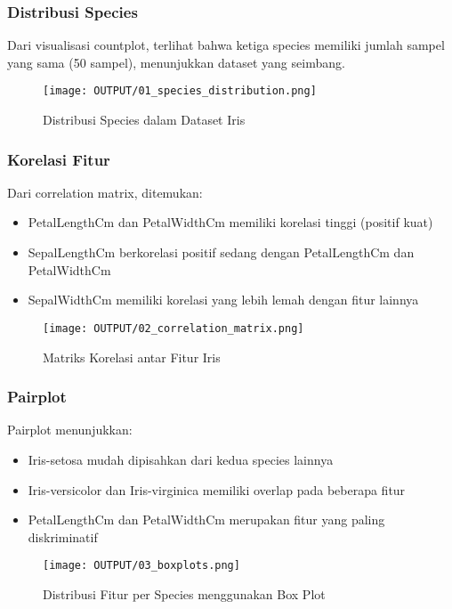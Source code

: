 \documentclass[11pt,a4paper]{article}
\begin{document}
\subsubsection{Distribusi Species}
Dari visualisasi countplot, terlihat bahwa ketiga species memiliki jumlah sampel yang sama (50 sampel), menunjukkan dataset yang seimbang.

\begin{figure}[h]
    \centering
    \texttt{[image: OUTPUT/01\_species\_distribution.png]}
    \caption{Distribusi Species dalam Dataset Iris}
    \label{fig:species_distribution}
\end{figure}

\subsubsection{Korelasi Fitur}
Dari correlation matrix, ditemukan:
\begin{itemize}
    \item PetalLengthCm dan PetalWidthCm memiliki korelasi tinggi (positif kuat)
    \item SepalLengthCm berkorelasi positif sedang dengan PetalLengthCm dan PetalWidthCm
    \item SepalWidthCm memiliki korelasi yang lebih lemah dengan fitur lainnya
\end{itemize}

\begin{figure}[h]
    \centering
    \texttt{[image: OUTPUT/02\_correlation\_matrix.png]}
    \caption{Matriks Korelasi antar Fitur Iris}
    \label{fig:correlation_matrix}
\end{figure}

\subsubsection{Pairplot}
Pairplot menunjukkan:
\begin{itemize}
    \item Iris-setosa mudah dipisahkan dari kedua species lainnya
    \item Iris-versicolor dan Iris-virginica memiliki overlap pada beberapa fitur
    \item PetalLengthCm dan PetalWidthCm merupakan fitur yang paling diskriminatif
\end{itemize}

\begin{figure}[h]
    \centering
    \texttt{[image: OUTPUT/03\_boxplots.png]}
    \caption{Distribusi Fitur per Species menggunakan Box Plot}
    \label{fig:boxplots}
\end{figure}
\end{document}
